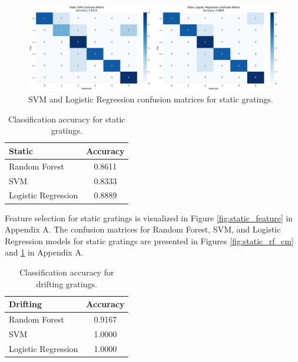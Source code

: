 \documentclass[10pt,twocolumn]{article}
\begin{document}
\begin{figure}[H]
\centering
\includegraphics[width=\linewidth]{report_images/static_SVM_LogR_confusion_matrix.png}
\caption{SVM and Logistic Regression confusion matrices for static gratings.}
\label{fig:static_svm_logr_cm}
\end{figure}


\begin{table}[H]
  \centering
  \begin{tabular}{l c}
  \hline
  \textbf{Static} & \textbf{Accuracy} \\
  \hline
  Random Forest        & 0.8611 \\
  SVM                  & 0.8333 \\
  Logistic Regression  & 0.8889 \\
  \hline
  \end{tabular}
  \caption{Classification accuracy for static gratings.}
  \label{tab:static_performance}
  \end{table}
    
  Feature selection for static gratings is visualized in Figure \ref{fig:static_feature} in Appendix A. The confusion matrices for Random Forest, SVM, and Logistic Regression models for static gratings are presented in Figures \ref{fig:static_rf_cm} and \ref{fig:static_svm_logr_cm} in Appendix A.
  
  \begin{table}[H]
  \centering
  \begin{tabular}{l c}
  \hline
  \textbf{Drifting} & \textbf{Accuracy} \\
  \hline
  Random Forest        & 0.9167 \\
  SVM                  & 1.0000 \\
  Logistic Regression  & 1.0000 \\
  \hline
  \end{tabular}
  \caption{Classification accuracy for drifting gratings.}
  \label{tab:drifting_performance}
  \end{table}
  
\end{document}
